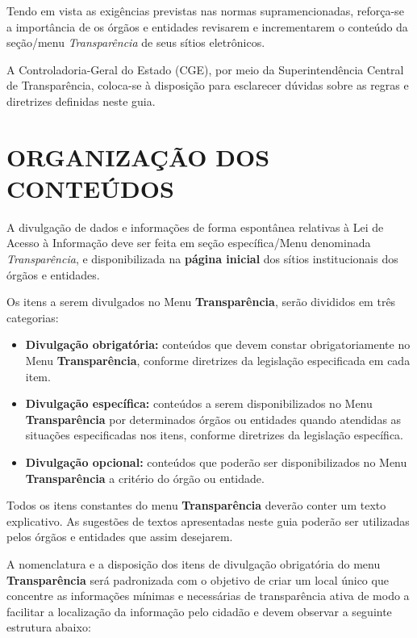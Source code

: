 \documentclass[]{book}
\begin{document}
Tendo em vista as exigências previstas nas normas supramencionadas, reforça-se a importância de os órgãos e entidades revisarem e incrementarem o conteúdo da seção/menu \emph{Transparência} de seus sítios eletrônicos.

A Controladoria-Geral do Estado (CGE), por meio da Superintendência Central de Transparência, coloca-se à disposição para esclarecer dúvidas sobre as regras e diretrizes definidas neste guia.

\hypertarget{organizauxe7uxe3o-dos-conteuxfados}{%
\chapter{ORGANIZAÇÃO DOS CONTEÚDOS}\label{organizauxe7uxe3o-dos-conteuxfados}}

A divulgação de dados e informações de forma espontânea relativas à Lei de Acesso à Informação deve ser feita em seção específica/Menu denominada \emph{Transparência}, e disponibilizada na \textbf{página inicial} dos sítios institucionais dos órgãos e entidades.

Os itens a serem divulgados no Menu \textbf{Transparência}, serão divididos em três categorias:

\begin{itemize}
\item
  \textbf{Divulgação obrigatória:} conteúdos que devem constar obrigatoriamente no Menu \textbf{Transparência}, conforme diretrizes da legislação especificada em cada item.
\item
  \textbf{Divulgação específica:} conteúdos a serem disponibilizados no Menu \textbf{Transparência} por determinados órgãos ou entidades quando atendidas as situações especificadas nos itens, conforme diretrizes da legislação específica.
\item
  \textbf{Divulgação opcional:} conteúdos que poderão ser disponibilizados no Menu \textbf{Transparência} a critério do órgão ou entidade.
\end{itemize}

Todos os itens constantes do menu \textbf{Transparência} deverão conter um texto explicativo. As sugestões de textos apresentadas neste guia poderão ser utilizadas pelos órgãos e entidades que assim desejarem.

A nomenclatura e a disposição dos itens de divulgação obrigatória do menu \textbf{Transparência} será padronizada com o objetivo de criar um local único que concentre as informações mínimas e necessárias de transparência ativa de modo a facilitar a localização da informação pelo cidadão e devem observar a seguinte estrutura abaixo:
\end{document}
